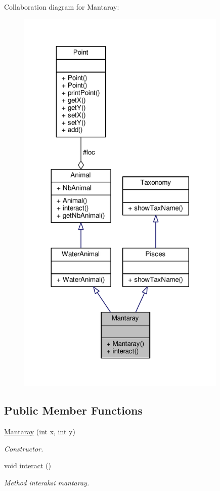 Collaboration diagram for Mantaray\+:
\nopagebreak
\begin{figure}[H]
\begin{center}
\leavevmode
\includegraphics[width=284pt]{classMantaray__coll__graph}
\end{center}
\end{figure}
\subsection*{Public Member Functions}
\begin{DoxyCompactItemize}
\item 
\hyperlink{classMantaray_abc2e69b76fb33a0e121e894e1d96352c}{Mantaray} (int x, int y)
\begin{DoxyCompactList}\small\item\em Constructor. \end{DoxyCompactList}\item 
void \hyperlink{classMantaray_ac6a64db1f04b43eec33887e625dd6761}{interact} ()\hypertarget{classMantaray_ac6a64db1f04b43eec33887e625dd6761}{}\label{classMantaray_ac6a64db1f04b43eec33887e625dd6761}

\begin{DoxyCompactList}\small\item\em Method interaksi mantaray. \end{DoxyCompactList}\end{DoxyCompactItemize}

